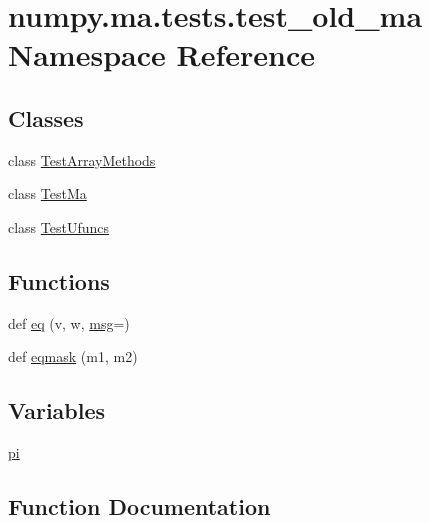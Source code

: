 \hypertarget{namespacenumpy_1_1ma_1_1tests_1_1test__old__ma}{}\section{numpy.\+ma.\+tests.\+test\+\_\+old\+\_\+ma Namespace Reference}
\label{namespacenumpy_1_1ma_1_1tests_1_1test__old__ma}
\subsection*{Classes}
\begin{DoxyCompactItemize}
\item 
class \hyperlink{classnumpy_1_1ma_1_1tests_1_1test__old__ma_1_1TestArrayMethods}{Test\+Array\+Methods}
\item 
class \hyperlink{classnumpy_1_1ma_1_1tests_1_1test__old__ma_1_1TestMa}{Test\+Ma}
\item 
class \hyperlink{classnumpy_1_1ma_1_1tests_1_1test__old__ma_1_1TestUfuncs}{Test\+Ufuncs}
\end{DoxyCompactItemize}
\subsection*{Functions}
\begin{DoxyCompactItemize}
\item 
def \hyperlink{namespacenumpy_1_1ma_1_1tests_1_1test__old__ma_aecfe74afa658fa8e6a3b42fbd8bc584a}{eq} (v, w, \hyperlink{namespacenumpy_ab96122eb8e44294b488b0ef93ec27d38}{msg}=\textquotesingle{}\textquotesingle{})
\item 
def \hyperlink{namespacenumpy_1_1ma_1_1tests_1_1test__old__ma_ae9e2bbdc06cbca80bf9d87157d5289d9}{eqmask} (m1, m2)
\end{DoxyCompactItemize}
\subsection*{Variables}
\begin{DoxyCompactItemize}
\item 
\hyperlink{namespacenumpy_1_1ma_1_1tests_1_1test__old__ma_af88613397587d76aa0c3a40936bb557d}{pi}
\end{DoxyCompactItemize}


\subsection{Function Documentation}
\mbox{\label{namespacenumpy_1_1ma_1_1tests_1_1test__old__ma_aecfe74afa658fa8e6a3b42fbd8bc584a}} 
